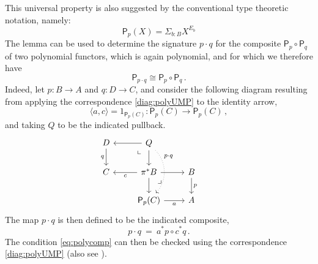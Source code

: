 \documentclass[12pt]{article}
\newcommand{\alg}[1]{\ensuremath{\mathsf{#1}}}
\renewcommand{\to}{\ensuremath{\rightarrow}}
\newcommand{\pbcorner}{\arrow[dr,phantom,"\lrcorner" very near start, shift right=.5ex]} %
\newcommand{\pbcornerright}{\arrow[dl,phantom,"\llcorner" very near start, shift left=.5ex]} %
\theoremstyle{remark}
\theoremstyle{definition}
\begin{document}
This universal property is also suggested by the conventional type theoretic notation, namely: $$\alg{P}_p (X) = \Sigma_{b:B} X^{E_b}$$
The lemma can be used to determine the signature $p\cdot q$ for the composite $\alg{P}_p \circ \alg{P}_q$ of two polynomial functors, which is again polynomial, and for which we therefore have
\begin{equation}\label{eq:polycomp}
\alg{P}_{p\cdot q} \cong \alg{P}_p \circ \alg{P}_q\,.
\end{equation}
Indeed, let $p : B \to A$ and $q : D \to C$, and consider the following diagram resulting from applying the correspondence \eqref{diag:polyUMP} to the identity arrow,
\[
\langle a, c\rangle = 1_{\alg{P}_p(C)} : \alg{P}_p(C) \to \alg{P}_p(C)\,,
\]
and taking $Q$ to be the indicated pullback.
%
\begin{equation}\label{diag:polyUMP}
\begin{tikzcd}
D \ar[d,swap,"q"] & \ar[l] Q \ar[d] \pbcornerright  \ar[dd, dotted, bend left = 10ex ,near start, "{p\cdot q}"]& & \\
 C  & \ar[l,"c"] \pi^*B \ar[d] \ar[r] \pbcorner & B \ar[d,"p"] \\
&  \alg{P}_p(C) \ar[r,swap,"a"] & A
\end{tikzcd}
\end{equation}
The map $p\cdot q$ is then defined to be the indicated composite,
\[
p\cdot q\ =\ a^*p \circ c^*q\,.
\]
The condition \eqref{eq:polycomp} can then be checked using the correspondence \eqref{diag:polyUMP} (also see \cite{GambinoKoch}).
\end{document}

